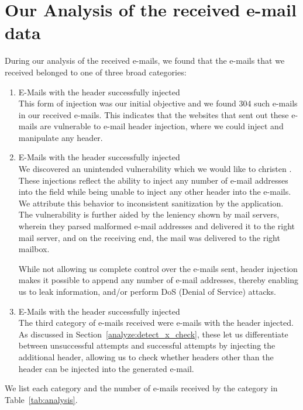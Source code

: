 \section[Analysis of Data]{Our Analysis of the received e-mail data}
During our analysis of the received e-mails, we found that the e-mails that we received belonged to one of three broad categories:
\begin{enumerate}
	\item E-Mails with the  header successfully injected\\
	This form of injection was our initial objective and we found 304 such e-mails in our received e-mails. This indicates that the websites that sent out these e-mails are vulnerable to e-mail header injection, where we could inject and manipulate any header.
	
	\item E-Mails with the  header successfully injected\\
	We discovered an unintended vulnerability which we would like to christen . These injections reflect the ability to inject any number of e-mail addresses into the  field while being unable to inject any other header into the e-mails. We attribute this behavior to inconsistent sanitization by the application. 
	The vulnerability is further aided by the leniency shown by mail servers, wherein they parsed malformed e-mail addresses and delivered it to the right mail server, and on the receiving end, the mail was delivered to the right mailbox. 
	
	While not allowing us complete control over the e-mails sent,  header injection makes it possible to append any number of e-mail addresses, thereby enabling us to leak information, and/or perform DoS (Denial of Service) attacks.
	
	\item E-Mails with the  header successfully injected\\
    The third category of e-mails received were e-mails with the  header injected. As discussed in Section~\ref{analyze:detect_x_check}, 
    these let us differentiate between unsuccessful attempts and successful attempts by injecting the additional header, allowing us to check whether headers other than the  header can be injected into the generated e-mail. 
\end{enumerate}
We list each category and the number of e-mails received by the category in Table~\ref{tab:analysis}. 

